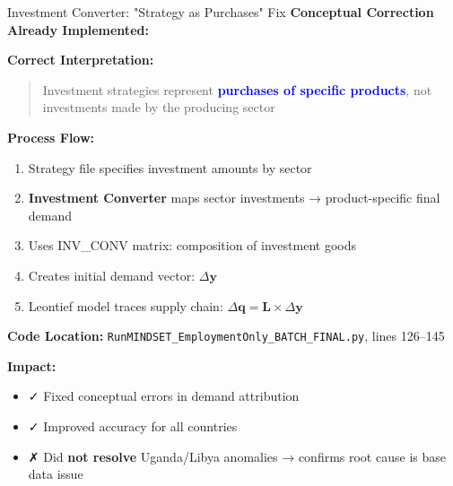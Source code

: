 \documentclass[10pt]{beamer}
\begin{document}
\begin{frame}{Investment Converter: "Strategy as Purchases" Fix}
\textbf{Conceptual Correction Already Implemented:}

\vspace{0.3cm}

\textbf{Correct Interpretation:}
\begin{quote}
Investment strategies represent \textcolor{blue}{\textbf{purchases of specific products}}, not investments made by the producing sector
\end{quote}

\vspace{0.3cm}

\textbf{Process Flow:}
\begin{enumerate}
    \item Strategy file specifies investment amounts by sector
    \item \textbf{Investment Converter} maps sector investments → product-specific final demand
    \item Uses INV\_CONV matrix: composition of investment goods
    \item Creates initial demand vector: $\Delta \mathbf{y}$
    \item Leontief model traces supply chain: $\Delta \mathbf{q} = \mathbf{L} \times \Delta \mathbf{y}$
\end{enumerate}

\vspace{0.3cm}

\textbf{Code Location:} \texttt{RunMINDSET\_EmploymentOnly\_BATCH\_FINAL.py}, lines 126--145

\vspace{0.3cm}

\textbf{Impact:}
\begin{itemize}
    \item ✓ Fixed conceptual errors in demand attribution
    \item ✓ Improved accuracy for all countries
    \item ✗ Did \textbf{not resolve} Uganda/Libya anomalies → confirms root cause is base data issue
\end{itemize}
\end{frame}
\end{document}
